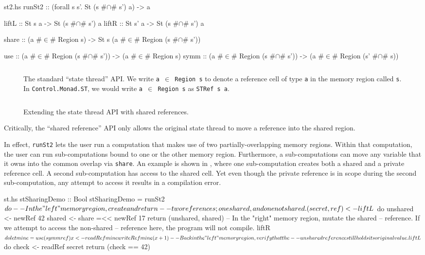 \documentclass[format=sigplan, review=false, screen=true]{acmart}
\begin{document}
\begin{filecontents*}{st2.hs}
runSt2 :: (forall s s'. St (s #$\cap$# s') a) -> a

liftL :: St s a -> St (s #$\cap$# s') a
liftR :: St s' a -> St (s #$\cap$# s') a

share :: (a #$\in$# Region s) -> St s (a #$\in$# Region (s #$\cap$# s'))

use  :: (a #$\in$# Region (s #$\cap$# s')) -> (a #$\in$# Region s)
symm :: (a #$\in$# Region (s #$\cap$# s')) -> (a #$\in$# Region (s' #$\cap$# s))
\end{filecontents*}

\begin{figure}
  \inputminted{haskell}{st1.hs}
  \caption{The standard ``state thread'' API. We write \texttt{a $\in$ Region s} to
    denote a reference cell of type \texttt{a} in the memory region called \texttt{s}.
    In \texttt{Control.Monad.ST}, we would write \texttt{a $\in$ Region s} as
    \texttt{STRef s a}.\label{st-api}}
\end{figure}

\begin{figure}
  \inputminted{haskell}{st2.hs}
  \caption{Extending the state thread API with shared references.\label{st-sharing-api}}
\end{figure}
Critically, the ``shared reference'' API only allows the
original state thread to move a reference into the shared region.

In effect, \texttt{runSt2} lets the user run a computation that makes use of
two partially-overlapping memory regions. Within that computation, the user
can run sub-computations bound to one or the other memory region. Furthermore,
a sub-computations can move any variable that it owns into the common overlap
via \texttt{share}. An example is shown in , where one sub-computation
creates both a shared and a private reference cell. A second sub-computation has
access to the shared cell. Yet even though the private reference is in scope during
the second sub-computation, any attempt to access it results in a compilation error.

\begin{filecontents*}{st.hs}
stSharingDemo :: Bool
stSharingDemo = runSt2 $ do
  -- In the "left" memory region, create and return
  -- two references; one shared, and one not shared.
  (secret, ref) <- liftL $ do
      unshared <- newRef 42
      shared   <- share =<< newRef 17
      return (unshared, shared)
  -- In the "right" memory region, mutate the shared
  -- reference. If we attempt to access the non-shared
  -- reference here, the program will not compile.
  liftR $ do
      let mine = use (symm ref)
      x <- readRef mine
      writeRef mine (x + 1)
  -- Back in the "left" memory region, verify that the
  -- unshared reference still holds its original value.
  liftL $ do
      check <- readRef secret
      return (check == 42)
\end{filecontents*}
\end{document}
